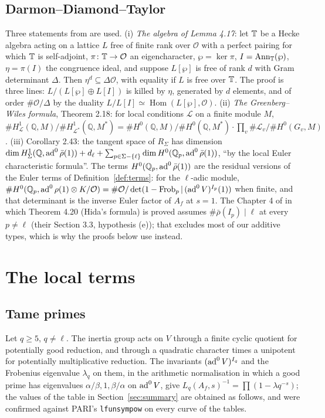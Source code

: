 \documentclass[11pt]{amsart}
\theoremstyle{definition}
\newcommand{\Q}{\mathbb{Q}}\newcommand{\Z}{\mathbb{Z}}\newcommand{\F}{\mathbb{F}}
\begin{document}
\subsection{Darmon--Diamond--Taylor}
Three statements from \cite{DDT} are used. (i) \emph{The algebra of Lemma 4.17}: let $\mathbb{T}$ be a Hecke algebra acting on a lattice $L$ free of finite rank over $\mathcal{O}$ with a perfect pairing for which $\mathbb{T}$ is self-adjoint, $\pi\colon\mathbb{T}\to\mathcal{O}$ an eigencharacter, $\wp=\ker\pi$, $I=\operatorname{Ann}_{\mathbb{T}}(\wp)$, $\eta=\pi(I)$ the congruence ideal, and suppose $L[\wp]$ is free of rank $d$ with Gram determinant $\Delta$. Then $\eta^d\subseteq\Delta\mathcal{O}$, with equality if $L$ is free over $\mathbb{T}$. The proof is three lines: $L/(L[\wp]\oplus L[I])$ is killed by $\eta$, generated by $d$ elements, and of order $\#\mathcal{O}/\Delta$ by the duality $L/L[I]\simeq\operatorname{Hom}(L[\wp],\mathcal{O})$. (ii) \emph{The Greenberg--Wiles formula}, Theorem 2.18: for local conditions $\mathcal{L}$ on a finite module $M$, $\#H^1_{\mathcal{L}}(\Q,M)/\#H^1_{\mathcal{L}^*}(\Q,M^*)=\#H^0(\Q,M)/\#H^0(\Q,M^*)\cdot\prod_v\#\mathcal{L}_v/\#H^0(G_v,M)$. (iii) Corollary 2.43: the tangent space of $R_\Sigma$ has dimension $\dim H^1_\Sigma(\Q,\ad\bar\rho(1))+d_\ell+\sum_{p\in\Sigma-\{\ell\}}\dim H^0(\Q_p,\ad\bar\rho(1))$, ``by the local Euler characteristic formula''. The terms $H^0(\Q_p,\ad\bar\rho(1))$ are the residual versions of the Euler terms of Definition~\ref{def:terms}: for the $\ell$-adic module, $\#H^0(\Q_p,\ad\rho(1)\otimes K/\mathcal{O})=\#\mathcal{O}/\det(1-\mathrm{Frob}_p\,|\,(\ad V)^{I_p}(1))$ when finite, and that determinant is the inverse Euler factor of $A_f$ at $s=1$. The Chapter 4 of \cite{DDT} in which Theorem 4.20 (Hida's formula) is proved assumes $\#\bar\rho(I_p)\mid\ell$ at every $p\ne\ell$ (their Section 3.3, hypothesis (e)); that excludes most of our additive types, which is why the proofs below use \cite{DFG04} instead.

\section{The local terms}\label{sec:euler}

\subsection{Tame primes}
Let $q\ge5$, $q\ne\ell$. The inertia group acts on $V$ through a finite cyclic quotient for potentially good reduction, and through a quadratic character times a unipotent for potentially multiplicative reduction. The invariants $(\operatorname{ad}^0 V)^{I_q}$ and the Frobenius eigenvalue $\lambda_q$ on them, in the arithmetic normalisation in which a good prime has eigenvalues $\alpha/\beta,1,\beta/\alpha$ on $\operatorname{ad}^0 V$, give $L_q(A_f,s)^{-1}=\prod(1-\lambda q^{-s})$; the values of the table in Section~\ref{sec:summary} are obtained as follows, and were confirmed against PARI's \texttt{lfunsympow} on every curve of the tables.
\end{document}
